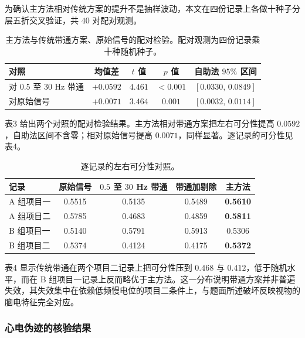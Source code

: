 \documentclass[bwprint]{gmcmthesis}
\begin{document}
为确认主方法相对传统方案的提升不是抽样波动，本文在四份记录上各做十种子分层五折交叉验证，共 $40$ 对配对观测。

\begin{table}[htp!]
\centering
\renewcommand\arraystretch{1.2}
\caption{主方法与传统带通方案、原始信号的配对检验。配对观测为四份记录乘十种随机种子。}
\begin{tabular}{|l|c|c|c|c|}
  \hline
  对照 & 均值差 & $t$ 值 & $p$ 值 & 自助法 $95\%$ 区间 \\
  \hline
  对 $0.5$ 至 $30$ Hz 带通 & $+0.0592$ & $4.461$ & $<0.001$ & $[0.0330,\,0.0849]$ \\
  \hline
  对原始信号 & $+0.0071$ & $3.464$ & $0.001$ & $[0.0032,\,0.0114]$ \\
  \hline
\end{tabular}
\end{table}

表3 给出两个对照的配对检验结果。主方法相对带通方案把左右可分性提高 $0.0592$，自助法区间不含零；相对原始信号提高 $0.0071$，同样显著。逐记录的可分性见表4。

\begin{table}[htp!]
\centering
\renewcommand\arraystretch{1.2}
\caption{逐记录的左右可分性对照。}
\begin{tabular}{|l|c|c|c|c|}
  \hline
  记录 & 原始信号 & $0.5$ 至 $30$ Hz 带通 & 带通加剔除 & 主方法 \\
  \hline
  A 组项目一 & 0.5515 & 0.5135 & 0.5489 & \textbf{0.5610} \\
  \hline
  A 组项目二 & 0.5785 & 0.4683 & 0.4859 & \textbf{0.5811} \\
  \hline
  B 组项目一 & 0.5140 & 0.5791 & 0.5913 & 0.5306 \\
  \hline
  B 组项目二 & 0.5374 & 0.4124 & 0.4175 & \textbf{0.5372} \\
  \hline
\end{tabular}
\end{table}

表4 显示传统带通在两个项目二记录上把可分性压到 $0.468$ 与 $0.412$，低于随机水平，而在 B 组项目一记录上反而略优于主方法。这一分布说明带通方案并非普遍失效，其失效集中在依赖低频慢电位的项目二条件上，与题面所述破坏反映视物的脑电特征完全对应。

\subsubsection{心电伪迹的核验结果}
\end{document}
